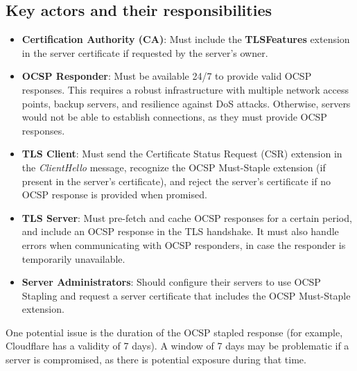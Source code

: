 \subsection*{Key actors and their responsibilities}
\begin{itemize}
    \item \textbf{Certification Authority (CA)}: Must include the
      \textbf{TLSFeatures} extension in the server certificate if
      requested by the server’s owner.
  
    \item \textbf{OCSP Responder}: Must be available 24/7 to provide
      valid OCSP responses. This requires a robust infrastructure with
      multiple network access points, backup servers, and resilience
      against DoS attacks. Otherwise, servers would not be able to
      establish connections, as they must provide OCSP responses.

    \item \textbf{TLS Client}: Must send the Certificate Status
      Request (CSR) extension in the \textit{ClientHello} message,
      recognize the OCSP Must-Staple extension (if present in the
      server's certificate), and reject the server’s certificate if no
      OCSP response is provided when promised.

    \item \textbf{TLS Server}: Must pre-fetch and cache OCSP responses
      for a certain period, and include an OCSP response in the TLS
      handshake. It must also handle errors when communicating with
      OCSP responders, in case the responder is temporarily
      unavailable.

    \item \textbf{Server Administrators}: Should configure their
      servers to use OCSP Stapling and request a server certificate
      that includes the OCSP Must-Staple extension.
\end{itemize}

One potential issue is the duration of the OCSP stapled response (for
example, Cloudflare has a validity of 7 days). A window of 7 days may
be problematic if a server is compromised, as there is potential
exposure during that time.
